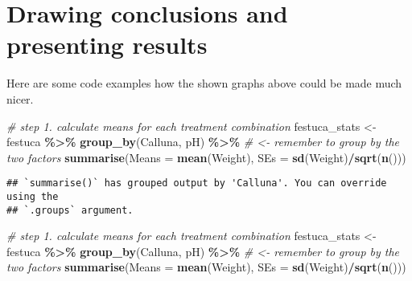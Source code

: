 \documentclass[
]{article}
\newenvironment{Shaded}{\begin{snugshade}}{\end{snugshade}}
\newcommand{\AttributeTok}[1]{\textcolor[rgb]{0.13,0.29,0.53}{#1}}
\newcommand{\CommentTok}[1]{\textcolor[rgb]{0.56,0.35,0.01}{\textit{#1}}}
\newcommand{\FunctionTok}[1]{\textcolor[rgb]{0.13,0.29,0.53}{\textbf{#1}}}
\newcommand{\NormalTok}[1]{#1}
\newcommand{\OtherTok}[1]{\textcolor[rgb]{0.56,0.35,0.01}{#1}}
\newcommand{\SpecialCharTok}[1]{\textcolor[rgb]{0.81,0.36,0.00}{\textbf{#1}}}
\begin{document}
\hypertarget{drawing-conclusions-and-presenting-results}{%
\section{Drawing conclusions and presenting
results}\label{drawing-conclusions-and-presenting-results}}

Here are some code examples how the shown graphs above could be made
much nicer.

\begin{Shaded}
\begin{Highlighting}[]
\CommentTok{\# step 1. calculate means for each treatment combination}
\NormalTok{festuca\_stats }\OtherTok{\textless{}{-}} 
\NormalTok{  festuca }\SpecialCharTok{\%\textgreater{}\%} 
  \FunctionTok{group\_by}\NormalTok{(Calluna, pH) }\SpecialCharTok{\%\textgreater{}\%} \CommentTok{\# \textless{}{-} remember to group by the two factors}
  \FunctionTok{summarise}\NormalTok{(}\AttributeTok{Means =} \FunctionTok{mean}\NormalTok{(Weight), }\AttributeTok{SEs =} \FunctionTok{sd}\NormalTok{(Weight)}\SpecialCharTok{/}\FunctionTok{sqrt}\NormalTok{(}\FunctionTok{n}\NormalTok{()))}
\end{Highlighting}
\end{Shaded}

\begin{verbatim}
## `summarise()` has grouped output by 'Calluna'. You can override using the
## `.groups` argument.
\end{verbatim}

\begin{Shaded}
\begin{Highlighting}[]
\CommentTok{\# step 1. calculate means for each treatment combination}
\NormalTok{festuca\_stats }\OtherTok{\textless{}{-}} 
\NormalTok{  festuca }\SpecialCharTok{\%\textgreater{}\%} 
  \FunctionTok{group\_by}\NormalTok{(Calluna, pH) }\SpecialCharTok{\%\textgreater{}\%} \CommentTok{\# \textless{}{-} remember to group by the two factors}
  \FunctionTok{summarise}\NormalTok{(}\AttributeTok{Means =} \FunctionTok{mean}\NormalTok{(Weight), }\AttributeTok{SEs =} \FunctionTok{sd}\NormalTok{(Weight)}\SpecialCharTok{/}\FunctionTok{sqrt}\NormalTok{(}\FunctionTok{n}\NormalTok{()))}
\end{Highlighting}
\end{Shaded}
\end{document}
